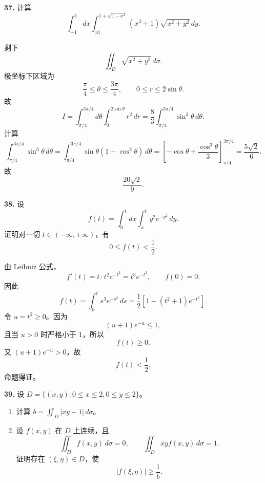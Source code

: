 \begin{problemblock}
\textbf{37.} 计算
\[
\int_{-1}^{1}dx\int_{|x|}^{1+\sqrt{1-x^2}}
(x^3+1)\sqrt{x^2+y^2}\,dy.
\]
\end{problemblock}

\begin{solutionblock}
剩下
\[
\iint_D\sqrt{x^2+y^2}\,d\sigma.
\]
极坐标下区域为
\[
\frac{\pi}{4}\le\theta\le\frac{3\pi}{4},\qquad 0\le r\le2\sin\theta.
\]
故
\[
I=\int_{\pi/4}^{3\pi/4}d\theta\int_0^{2\sin\theta}r^2\,dr
=\frac83\int_{\pi/4}^{3\pi/4}\sin^3\theta\,d\theta.
\]
计算
\[
\int_{\pi/4}^{3\pi/4}\sin^3\theta\,d\theta
=\int_{\pi/4}^{3\pi/4}\sin\theta(1-\cos^2\theta)\,d\theta
=\left[-\cos\theta+\frac{\cos^3\theta}{3}\right]_{\pi/4}^{3\pi/4}
=\frac{5\sqrt2}{6}.
\]
故
\[
\boxed{\frac{20\sqrt2}{9}}.
\]
\end{solutionblock}

\begin{problemblock}
\textbf{38.} 设
\[
f(t)=\int_0^t dx\int_x^t y^2e^{-y^2}\,dy.
\]
证明对一切 \(t\in(-\infty,+\infty)\)，有
\[
0\le f(t)<\frac12.
\]
\end{problemblock}

\begin{solutionblock}
由 Leibniz 公式，
\[
f'(t)=t\cdot t^2e^{-t^2}=t^3e^{-t^2},\qquad f(0)=0.
\]
因此
\[
f(t)=\int_0^t s^3e^{-s^2}\,ds
=\frac12\left[1-(t^2+1)e^{-t^2}\right].
\]
令 \(u=t^2\ge0\)。因为
\[
(u+1)e^{-u}\le1,
\]
且当 \(u>0\) 时严格小于 \(1\)，所以
\[
f(t)\ge0.
\]
又 \((u+1)e^{-u}>0\)，故
\[
f(t)<\frac12.
\]
命题得证。
\end{solutionblock}

\begin{problemblock}
\textbf{39.} 设 \(D=\{(x,y):0\le x\le2,0\le y\le2\}\)。
\begin{enumerate}
\item 计算 \(b=\iint_D|xy-1|\,d\sigma\)。
\item 设 \(f(x,y)\) 在 \(D\) 上连续，且
\[
\iint_Df(x,y)\,d\sigma=0,\qquad
\iint_Dxyf(x,y)\,d\sigma=1.
\]
证明存在 \((\xi,\eta)\in D\)，使
\[
|f(\xi,\eta)|\ge\frac1b.
\]
\end{enumerate}
\end{problemblock}

